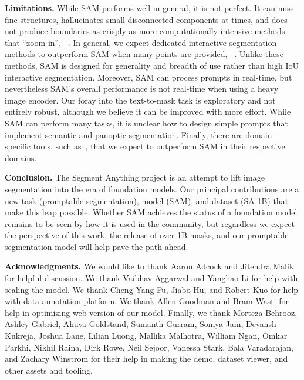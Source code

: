 \documentclass[10pt,twocolumn,letterpaper]{article}
\renewcommand{\paragraph}[1]{\vspace{1.25mm}\noindent\textbf{#1}}
\newcommand{\sad}{\mbox{SA-1B}\xspace}
\newcommand{\sam}{SAM\xspace}
\begin{document}
\paragraph{Limitations.} While \sam performs well in general, it is not perfect. It can miss fine structures, hallucinates small disconnected components at times, and does not produce boundaries as crisply as more computationally intensive methods that ``zoom-in'', \eg~\cite{chen2022focalclick}. In general, we expect dedicated interactive segmentation methods to outperform \sam when many points are provided, \eg~\cite{liu2022simpleclick}. Unlike these methods, \sam is designed for generality and breadth of use rather than high IoU interactive segmentation. Moreover, \sam can process prompts in real-time, but nevertheless \sam's overall performance is not real-time when using a heavy image encoder. Our foray into the text-to-mask task is exploratory and not entirely robust, although we believe it can be improved with more effort. While \sam can perform many tasks, it is unclear how to design simple prompts that implement semantic and panoptic segmentation. Finally, there are domain-specific tools, such as~\cite{berg2019}, that we expect to outperform \sam in their respective domains.

\paragraph{Conclusion.} The Segment Anything project is an attempt to lift image segmentation into the era of foundation models. Our principal contributions are a new task (promptable segmentation), model (\sam), and dataset (\sad) that make this leap possible. Whether \sam achieves the status of a foundation model remains to be seen by how it is used in the community, but regardless we expect the perspective of this work, the release of over 1B masks, and our promptable segmentation model will help pave the path ahead.

\paragraph{Acknowledgments.} We would like to thank Aaron Adcock and Jitendra Malik for helpful discussion. We thank Vaibhav Aggarwal and Yanghao Li for help with scaling the model. We thank Cheng-Yang Fu, Jiabo Hu, and Robert Kuo for help with data annotation platform. We thank Allen Goodman and Bram Wasti for help in optimizing web-version of our model. Finally, we thank Morteza Behrooz, Ashley Gabriel, Ahuva Goldstand, Sumanth Gurram, Somya Jain, Devansh Kukreja, Joshua Lane, Lilian Luong, Mallika Malhotra, William Ngan, Omkar Parkhi, Nikhil Raina, Dirk Rowe, Neil Sejoor, Vanessa Stark, Bala Varadarajan, and Zachary Winstrom for their help in making the demo, dataset viewer, and other assets and tooling.
\end{document}
